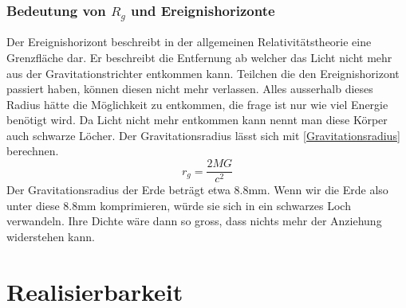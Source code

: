\begin{refsection}
	\subsubsection{Bedeutung von $R_{g}$ und Ereignishorizonte}
	Der Ereignishorizont beschreibt in der allgemeinen Relativitätstheorie eine Grenzfläche dar. Er beschreibt die Entfernung ab welcher das Licht nicht mehr aus der Gravitationstrichter entkommen kann. Teilchen die den Ereignishorizont passiert haben, können diesen nicht mehr verlassen. Alles ausserhalb dieses Radius hätte die Möglichkeit zu entkommen, die frage ist nur wie viel Energie benötigt wird. Da Licht nicht mehr entkommen kann nennt man diese Körper auch schwarze Löcher.
	Der Gravitationsradius lässt sich mit \ref{Gravitationsradius} berechnen.
	\begin{equation} \label{Gravitationsradius}
		r_{g}= \frac{2MG}{c^2}
	\end{equation}
    Der Gravitationsradius der Erde beträgt etwa 8.8mm. Wenn wir die Erde also unter  diese 8.8mm komprimieren, würde sie sich in ein schwarzes Loch verwandeln. Ihre Dichte wäre dann so gross, dass nichts mehr der Anziehung widerstehen kann.
	
	\section{Realisierbarkeit}
	

\end{refsection}
